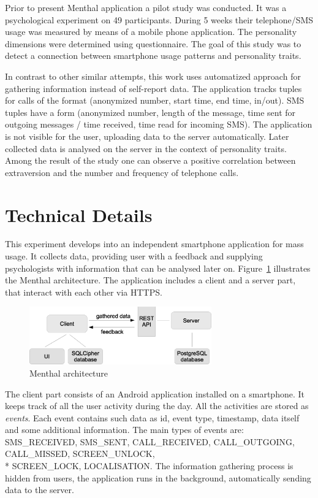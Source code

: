 Prior to present Menthal application a pilot study was conducted. 
It was a psychological experiment on 49 participants.
During 5 weeks their telephone/SMS usage was measured by means of a mobile phone application.
The personality dimensions were determined using questionnaire.
The goal of this study was to detect a connection between smartphone usage patterns and personality traits.

In contrast to other similar attempts, this work uses automatized approach for gathering information instead of self-report data.
The application tracks tuples for calls of the format (anonymized number, start time, end time, in/out).
SMS tuples have a form (anonymized number, length of the message, time sent for outgoing messages / time received, time read for incoming SMS).
The application is not visible for the user, uploading data to the server automatically.
Later collected data is analysed on the server in the context of personality traits.
Among the result of the study one can observe a positive correlation between extraversion and the number and frequency of telephone calls.

\section{Technical Details}
This experiment develops into an independent smartphone application for mass usage. 
It collects data, providing user with a feedback and supplying psychologists with information that can be analysed later on.
Figure~\ref{fig:menthal_architecture} illustrates the Menthal architecture.
The application includes a client and a server part, that interact with each other via HTTPS.

\begin{figure}[h]
  \centering
  \includegraphics [width=0.7\textwidth]{images/Menthal_architecture}
  \caption{Menthal architecture}
  \label{fig:menthal_architecture}
\end{figure}

The client part consists of an Android application installed on a smartphone.
It keeps track of all the user activity during the day.
All the activities are stored as \textit{events}.
Each event contains such data as id, event type, timestamp, data itself and some additional information.
The main types of events are: SMS\_RECEIVED, SMS\_SENT, CALL\_RECEIVED, CALL\_OUTGOING, CALL\_MISSED, SCREEN\_UNLOCK, \\*
 SCREEN\_LOCK, LOCALISATION.
The information gathering process is hidden from users, the application runs in the background, automatically sending data to the server.

